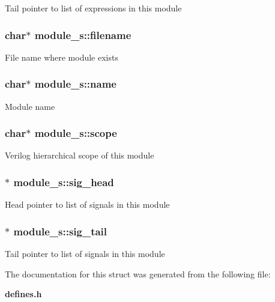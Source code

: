 Tail pointer to list of expressions in this module 
\subsubsection{\setlength{\rightskip}{0pt plus 5cm}char$\ast$ module\_\-s::filename}\label{structmodule__s_m1}


File name where module exists 
\subsubsection{\setlength{\rightskip}{0pt plus 5cm}char$\ast$ module\_\-s::name}\label{structmodule__s_m0}


Module name 
\subsubsection{\setlength{\rightskip}{0pt plus 5cm}char$\ast$ module\_\-s::scope}\label{structmodule__s_m2}


Verilog hierarchical scope of this module 
\subsubsection{$\ast$ module\_\-s::sig\_\-head}\label{structmodule__s_m3}


Head pointer to list of signals in this module 
\subsubsection{$\ast$ module\_\-s::sig\_\-tail}\label{structmodule__s_m4}


Tail pointer to list of signals in this module 

The documentation for this struct was generated from the following file:\begin{CompactItemize}
\item 
{\bf defines.h}\end{CompactItemize}
